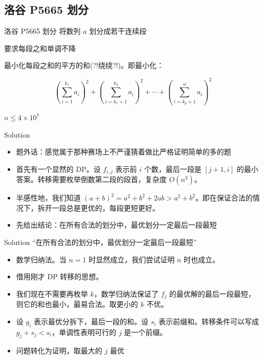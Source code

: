 ﻿\documentclass[aspectratio=169,handout]{ctexbeamer}
\begin{document}
\subsection{洛谷 P5665 划分}
\begin{frame}{洛谷 P5665 划分}
    将数列 $a$ 划分成若干连续段

要求每段之和\textcolor{peaking}{单调不降}

最小化每段之和的平方的和(?!绕绕?!)。即最小化：

$$ \left(\sum_{i=1}^{k_1} a_i\right)^2 + \left(\sum_{i=k_1+1}^{k_2} a_i\right)^2 + \cdots + \left(\sum_{i=k_p+1}^{n} a_i\right)^2 $$

$n\leq 4\times 10^7$
\end{frame}

\begin{frame}{Solution}
    \begin{itemize}
        \item 题外话：感觉属于那种赛场上不严谨猜着做比严格证明简单的多的题
        \pause
        \item 首先有一个显然的 DP。设 $f_{i,j}$ 表示前 $i$ 个数，最后一段是 $[j+1,i]$ 的最小答案。转移需要枚举倒数第二段的段首，复杂度 $O(n^3)$。
        \pause
        \item 半感性地，我们知道 $(a+b)^2=a^2+b^2+2ab>a^2+b^2$。即在保证合法的情况下，拆开一段总是更优的，每段更短更好。
        \pause
        \item 先给出结论：在所有合法的划分中，最优划分一定最后一段最短
    \end{itemize}
\end{frame}


\begin{frame}{Solution}
    “在所有合法的划分中，最优划分一定最后一段最短”
    \pause
    \begin{itemize}
        \item 数学归纳法。当 $n=1$ 时显然成立，我们尝试证明 $n$ 时也成立。
        \pause
        \item 借用刚才 DP 转移的思想。
        \item 我们现在不需要再枚举 $k$，数学归纳法保证了 $f_j$ 的最优解的最后一段最短，则它的和也最小，最易合法。取更小的 $k$ 不优。
        \pause
        \item 设 $g_i$ 表示最优分拆下，最后一段的和。设 $s_i$ 表示前缀和。转移条件可以写成 $g_j+s_j<s_i$，单调性表明可行的 $j$ 是一个前缀。
        \item 问题转化为证明，取最大的 $j$ 最优
    \end{itemize}
\end{frame}
\end{document}
